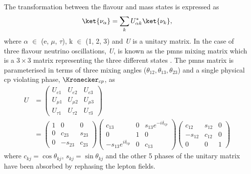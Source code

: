 The transformation between the flavour and mass states is expressed as
\begin{equation}\label{eqn:state transformation}
    \ket{\nu_\alpha} = \sum_k U^*_{\alpha k} \ket{\nu_k},
\end{equation}
where $\alpha$ $\in$ (e, $\mu$, $\tau$), k $\in$ (1, 2, 3) and \textit{U} is a unitary matrix. In the case of three flavour neutrino oscillations, \textit{U}, is known as the \gls{pmns} mixing matrix which is a $3 \times 3$ matrix representing the three different states \cite{Fundamentals_of_Neutrino_Physics_and_Astrophysics}. The \gls{pmns} matrix is parameterised in terms of three mixing angles ($\theta_{12}, \theta_{13}, \theta_{23}$) and a single physical \gls{cp} violating phase, \textit{$\Kronecker_{cp}$}, as
\begin{equation}
\begin{split}
U &= 
\begin{pmatrix}
U_{e1} & U_{e2} & U_{e3} \\
U_{\mu1} & U_{\mu2} & U_{\mu3}  \\
U_{\tau1} & U_{\tau2} & U_{\tau3}
\end{pmatrix} \\
&=
\begin{pmatrix}
1 & 0 & 0 \\
0 & c_{23} & s_{23}  \\
0 & -s_{23} & c_{23}
\end{pmatrix}
\begin{pmatrix}
c_{13} & 0 & s_{13}e^{-i\delta_{cp}} \\
0 & 1 & 0  \\
-s_{13}e^{i\delta_{cp}} & 0 & c_{13}
\end{pmatrix}
\begin{pmatrix}
c_{12} & s_{12} & 0 \\
-s_{12} & c_{12} & 0  \\
0 & 0 & 1
\end{pmatrix}
\end{split}
\end{equation}
where $c_{kj} = \cos{\theta_{kj}}$, $s_{kj} = \sin{\theta_{kj}}$ and the other 5 phases of the unitary matrix have been absorbed by rephasing the lepton fields.

